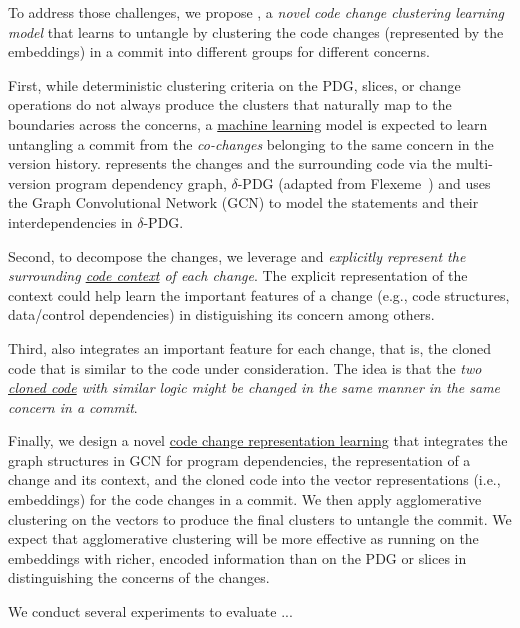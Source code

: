 
To address those challenges, we propose {\tool}, a {\em novel code
  change clustering learning model} that learns to untangle by
clustering the code changes (represented by the embeddings) in a
commit into different groups for different concerns.



First, while deterministic clustering criteria on the PDG, slices, or
change operations do not always produce the clusters that naturally
map to the boundaries across the concerns, a \underline{machine
  learning} model is expected to learn untangling a commit from the
{\em co-changes} belonging to the same concern in the version history.
%
{\tool} represents the changes and the surrounding code via the
multi-version program dependency graph, $\delta$-PDG (adapted from
Flexeme~\cite{flexeme-fse20}) and uses the Graph Convolutional Network
(GCN) to model the statements and their interdependencies in
$\delta$-PDG.

Second, to decompose the changes, we leverage and {\em
  explicitly represent the surrounding \underline{code context} of
  each change}. The explicit representation of the context could help
{\tool} learn the important features of a change (e.g., code
structures, data/control dependencies) in distiguishing its concern
among others.

Third, {\tool} also integrates an important feature for
each change, that is, the cloned code that is similar to the code
under consideration. The idea is that the {\em two \underline{cloned code} with
  similar logic might be changed in the same manner in the same
  concern in a commit}.

Finally, we design a novel \underline{code change representation learning}
that integrates the graph structures in GCN for program dependencies,
the representation of a change and its context, and the cloned code
into the vector representations (i.e., embeddings) for the code
changes in a commit. We then apply agglomerative clustering on the
vectors to produce the final clusters to untangle the commit. We
expect that agglomerative clustering will be more effective as running
on the embeddings with richer, encoded information than on the PDG or
slices in distinguishing the concerns of the changes.

We conduct several experiments to evaluate {\tool}...

